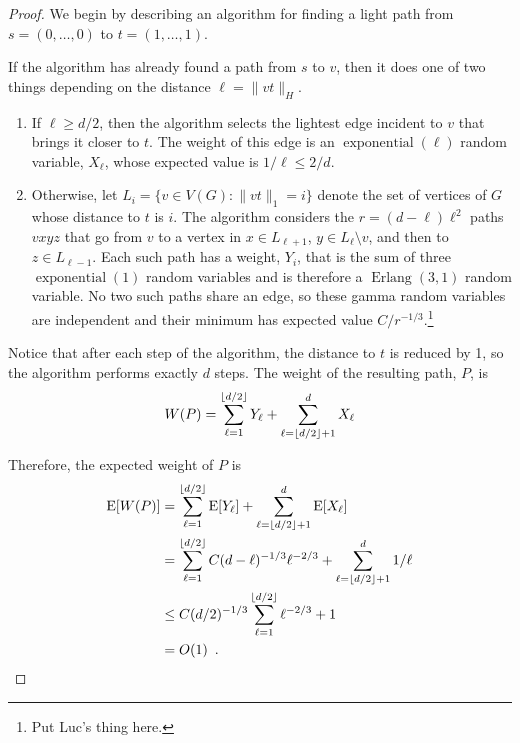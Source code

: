 \documentclass[lotsofwhite]{patmorin}
\DeclareMathOperator{\exponential}{exponential}
\DeclareMathOperator{\erlang}{Erlang}
\begin{document}
\begin{proof}
  We begin by describing an algorithm for finding a light path from
  $s=(0,\ldots,0)$ to $t=(1,\ldots,1)$.  

  If the algorithm has already found a path from $s$
  to $v$, then it does one of two things depending on the distance
  $\ell=\|vt\|_H$.
  \begin{enumerate}
     \item If $\ell \ge d/2$, then the algorithm selects the lightest
     edge incident to $v$ that brings it closer to $t$. The weight of
     this edge is an $\exponential(\ell)$ random variable, $X_\ell$,
     whose expected value is $1/\ell\le 2/d$.

   \item Otherwise, let $L_i = \{ v\in V(G) : \|vt\|_1=i\}$ denote the
    set of vertices of $G$ whose distance to $t$ is $i$.  The algorithm
    considers the $r=(d-\ell)\ell^2$ paths $vxyz$ that go from $v$ to a
    vertex in $x\in L_{\ell+1}$, $y\in L_{\ell}\setminus v$, and then to
    $z\in L_{\ell-1}$.  Each such path has a weight, $Y_i$, that is the
    sum of three $\exponential(1)$ random variables and is therefore a
    $\erlang(3,1)$ random variable.  No two such paths share an edge,
    so these gamma random variables are independent and their minimum
    has expected value $C/r^{-1/3}$.\footnote{Put Luc's thing here.}
  \end{enumerate}
  Notice that after each step of the algorithm, the distance to $t$ is
  reduced by 1, so the algorithm performs exactly $d$ steps.  The weight
  of the resulting path, $P$, is
  \begin{equation}
     W(P)  = \sum_{\ell=1}^{\lfloor d/2\rfloor} Y_\ell +
              \sum_{\ell=\lfloor d/2\rfloor+1}^d X_\ell
     \eqlabel{foxtrot-weight}
  \end{equation}
  
  Therefore, the expected weight of $P$ is 
  \begin{align*}
      \mathrm{E}[W(P)] & = \sum_{\ell=1}^{\lfloor d/2\rfloor} \mathrm{E}[Y_\ell] +
              \sum_{\ell=\lfloor d/2\rfloor+1}^d \mathrm{E}[X_\ell] \\
    & = \sum_{\ell=1}^{\lfloor d/2\rfloor} C(d-\ell)^{-1/3}\ell^{-2/3} +
     \sum_{\ell=\lfloor d/2\rfloor+1}^d 1/\ell \\
     & \le
     C(d/2)^{-1/3}\sum_{\ell=1}^{\lfloor d/2\rfloor} \ell^{-2/3} + 1 \\
     & = O(1) \enspace .
  \end{align*}


\end{proof}
\end{document}
